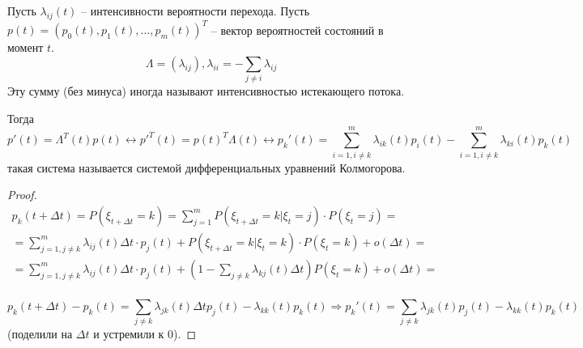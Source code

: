 \begin{theorem}
  Пусть $\lambda_{ij}(t)$ -- интенсивности вероятности перехода. Пусть
  $p(t) = (p_0(t), p_1(t), \dots, p_m(t))^T$
  -- вектор вероятностей состояний в момент $t$.
  \[
    \Lambda = (\lambda_{ij}), \lambda_{ii} = - \sum_{j\neq i} \lambda_{ij} 
  \]
  Эту сумму (без минуса) иногда называют интенсивностью истекающего потока.

  Тогда
  \[
    p'(t) = \Lambda^T(t) p(t) 
    \leftrightarrow
    p'^T(t) = p(t)^T \Lambda(t)
    \leftrightarrow
    p_k'(t)
    = \sum_{i=1, i\neq k}^m \lambda_{ik}(t) p_{i}(t)
      - \sum_{i=1, i\neq k}^m \lambda_{ki}(t) p_k(t)
  \]
  такая система называется системой дифференциальных уравнений Колмогорова.
\end{theorem}
\begin{proof}
  \begin{multline*}
    p_k(t+\Delta t) = P(\xi_{t+\Delta t} = k)
    = \sum_{j=1}^m P(\xi_{t+\Delta t} = k | \xi_t = j) \cdot P(\xi_t = j) = \\
    = \sum_{j=1, j \neq k}^m \lambda_{ij}(t) \Delta t \cdot p_j(t)
      + P(\xi_{t+\Delta t} = k | \xi_t = k) \cdot P(\xi_t = k) + o(\Delta t) = \\
    = \sum_{j=1, j \neq k}^m \lambda_{ij}(t) \Delta t \cdot p_j(t)
      + \left( 1 - \sum_{j\neq k} \lambda_{kj}(t) \Delta t\right)  P(\xi_t = k) + o(\Delta t) = \\
  \end{multline*}

  \[
    p_k(t+\Delta t) - p_k(t) = \sum_{j\neq k} \lambda_{jk}(t) \Delta t p_j(t) - \lambda_{kk} (t) p_k(t)
    \Rightarrow
    p_k'(t) = \sum_{j\neq k} \lambda_{jk} (t) p_j(t) - \lambda_{kk}(t) p_k(t)
  \]
  (поделили на $\Delta t$ и устремили к 0).
\end{proof}

